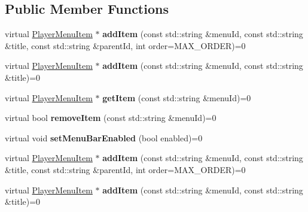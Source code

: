 \subsection*{Public Member Functions}
\begin{DoxyCompactItemize}
\item 
\mbox{\label{classPlayerMenuServiceProtocol_aed8d43ddcb04cd0f8411b5eed2e67160}} 
virtual \hyperlink{classPlayerMenuItem}{Player\+Menu\+Item} $\ast$ {\bfseries add\+Item} (const std\+::string \&menu\+Id, const std\+::string \&title, const std\+::string \&parent\+Id, int order=M\+A\+X\+\_\+\+O\+R\+D\+ER)=0
\item 
\mbox{\label{classPlayerMenuServiceProtocol_a975cb328e2a1d434322222437bd5cac1}} 
virtual \hyperlink{classPlayerMenuItem}{Player\+Menu\+Item} $\ast$ {\bfseries add\+Item} (const std\+::string \&menu\+Id, const std\+::string \&title)=0
\item 
\mbox{\label{classPlayerMenuServiceProtocol_aeabe33a0b1126f90cac7823f1ec8365c}} 
virtual \hyperlink{classPlayerMenuItem}{Player\+Menu\+Item} $\ast$ {\bfseries get\+Item} (const std\+::string \&menu\+Id)=0
\item 
\mbox{\label{classPlayerMenuServiceProtocol_a1cb1e53ad68acb448232673dd6a2940d}} 
virtual bool {\bfseries remove\+Item} (const std\+::string \&menu\+Id)=0
\item 
\mbox{\label{classPlayerMenuServiceProtocol_ab8b780c9a0d80aaf622808f0a67c9c42}} 
virtual void {\bfseries set\+Menu\+Bar\+Enabled} (bool enabled)=0
\item 
\mbox{\label{classPlayerMenuServiceProtocol_aed8d43ddcb04cd0f8411b5eed2e67160}} 
virtual \hyperlink{classPlayerMenuItem}{Player\+Menu\+Item} $\ast$ {\bfseries add\+Item} (const std\+::string \&menu\+Id, const std\+::string \&title, const std\+::string \&parent\+Id, int order=M\+A\+X\+\_\+\+O\+R\+D\+ER)=0
\item 
\mbox{\label{classPlayerMenuServiceProtocol_a975cb328e2a1d434322222437bd5cac1}} 
virtual \hyperlink{classPlayerMenuItem}{Player\+Menu\+Item} $\ast$ {\bfseries add\+Item} (const std\+::string \&menu\+Id, const std\+::string \&title)=0

\end{DoxyCompactItemize}
